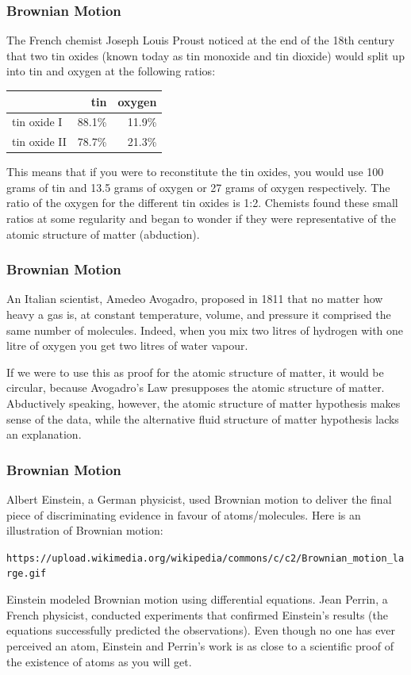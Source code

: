 \documentclass[xcolor=dvipsnames]{beamer}
\begin{document}
\begin{frame}[fragile]
  \frametitle{Brownian Motion}
The French chemist Joseph Louis Proust noticed at the end of the 18th
century that two tin oxides (known today as tin monoxide and tin
dioxide) would split up into tin and oxygen at the following ratios:

\medskip

\begin{center}
\begin{tabular}{|l|r|r|}\hline
  & tin & oxygen \\ \hline
  tin oxide I & 88.1\% & 11.9\% \\ \hline
  tin oxide II & 78.7\% & 21.3\% \\ \hline
\end{tabular}
\end{center}

\medskip

This means that if you were to reconstitute the tin oxides, you would
use 100 grams of tin and 13.5 grams of oxygen or 27 grams of oxygen
respectively. The ratio of the oxygen for the different tin oxides is
1:2. Chemists found these small ratios at some regularity and began to
wonder if they were representative of the atomic structure of matter
(abduction).
\end{frame}

\begin{frame}
  \frametitle{Brownian Motion}
  An Italian scientist, Amedeo Avogadro, proposed in 1811 that no
  matter how heavy a gas is, at constant temperature, volume, and
  pressure it comprised the same number of molecules. Indeed, when you
  mix two litres of hydrogen with one litre of oxygen you get two
  litres of water vapour.

  \bigskip

  If we were to use this as proof for the
  atomic structure of matter, it would be circular, because Avogadro's
  Law presupposes the atomic structure of matter. Abductively
  speaking, however, the atomic structure of matter hypothesis makes
  sense of the data, while the alternative fluid structure of matter
  hypothesis lacks an explanation.
\end{frame}

\begin{frame}
  \frametitle{Brownian Motion}
  Albert Einstein, a German physicist, used Brownian motion to deliver
  the final piece of discriminating evidence in favour of
  atoms/molecules. Here is an illustration of Brownian motion:
  \begin{alltt}
    \tiny https://upload.wikimedia.org/wikipedia/commons/c/c2/Brownian\_motion\_large.gif
  \end{alltt}
  Einstein modeled Brownian motion using differential equations. Jean
  Perrin, a French physicist, conducted experiments that confirmed
  Einstein's results (the equations successfully predicted the
  observations). Even though no one has ever perceived an atom,
  Einstein and Perrin's work is as close to a scientific proof of the
  existence of atoms as you will get.
\end{frame}
\end{document}
